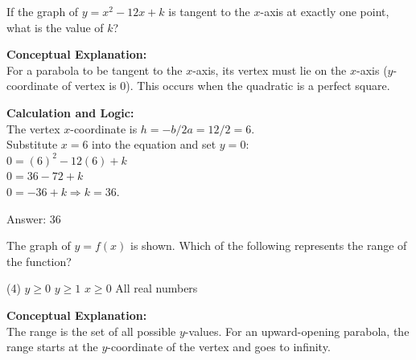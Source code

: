 \documentclass[11pt,paper=a4,answers]{exam}
\begin{document}
\begin{questions}
\vspace{40pt}

\question
If the graph of $y = x^2 - 12x + k$ is tangent to the $x$-axis at exactly one point, what is the value of $k$?

\begin{solution}
\textbf{Conceptual Explanation:} \\
For a parabola to be tangent to the $x$-axis, its vertex must lie on the $x$-axis ($y$-coordinate of vertex is 0). This occurs when the quadratic is a perfect square.

\vspace{20pt}

\textbf{Calculation and Logic:} \\
The vertex $x$-coordinate is $h = -b/2a = 12/2 = 6$. \\
Substitute $x=6$ into the equation and set $y=0$: \\
$0 = (6)^2 - 12(6) + k$ \\
$0 = 36 - 72 + k$ \\
$0 = -36 + k \Rightarrow k = 36$.

\vspace{25pt}

Answer: \colorbox{yellow!100}{36}
\end{solution}

\vspace{40pt}

\question
\begin{center}
\end{center}
The graph of $y = f(x)$ is shown. Which of the following represents the range of the function?
\begin{tasks}(4)
    \task $y \geq 0$
    \task $y \geq 1$
    \task $x \geq 0$
    \task All real numbers
\end{tasks}

\begin{solution}
\textbf{Conceptual Explanation:} \\
The range is the set of all possible $y$-values. For an upward-opening parabola, the range starts at the $y$-coordinate of the vertex and goes to infinity.


\end{solution}
\end{questions}
\end{document}
